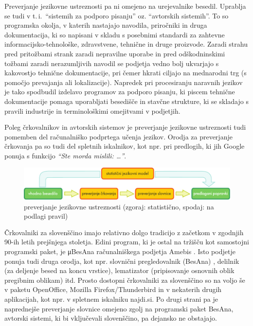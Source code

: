 \begin{multicols}{2}
Preverjanje jezikovne ustreznosti pa ni omejeno na urejevalnike besedil. Uprab\-lja se tudi v t.\,i.~“sistemih za podporo pisanju” oz. “avtorskih sistemih”. To so programska okolja, v katerih nastajajo navodila, priročniki in druga dokumentacija, ki so napisani v skladu s posebnimi standardi za zah\-tevne informacij\-sko-tehnološke, zdravstvene, tehnične in druge proizvode. Zaradi strahu pred pritožbami strank zaradi nepravilne uporabe in pred odškodninskimi tožbami zaradi nerazumljivih navodil se podjetja vedno bolj ukvarjajo s kakovostjo tehnične dokumentacije, pri čemer hkrati ciljajo na mednarodni trg (s pomočjo prevajanja ali lokalizacije). Napredek pri procesiranju naravnih jezikov je tako spodbudil izdelavo programov za podporo pisanju, ki piscem tehnične dokumentacije pomaga uporab\-ljati besedišče in stavčne strukture, ki se skladajo s pravili industrije in terminološkimi omejitvami v podjetjih.

Poleg črkovalnikov in avtorskih sistemov je preverjanje jezikovne ustreznosti tudi pomemben del računalniško podprtega učenja jezikov. Orodja za preverjanje črkovanja pa so tudi del spletnih iskalnikov, kot npr. pri predlogih, ki jih Google ponuja s funkcijo \textit{“Ste morda mislili: …”}.


\begin{figure}[htb]
  \center
  \includegraphics[width=\textwidth]{../_media/slovene/language_checking}
  \caption{preverjanje jezikovne ustreznosti (zgoraj: statistično, spodaj: na podlagi pravil)}
  \label{fig:langcheckingaarch_de}
\end{figure}

Črkovalniki za slovenščino imajo relativno dolgo tradicijo z začetkom v zgodnjih 90-ih letih prejšnjega stoletja. Edini program, ki je ostal na tržišču kot samostojni programski paket, je μBesAna računalniškega podjetja Amebis  \cite{Amb1}. Isto podjetje ponuja tudi druga orodja, kot npr. slovnični pregledovalnik (BesAna) \cite{Amb2}, delilnik (za deljenje besed na koncu vrstice), lematizator (pripisovanje osnovnih oblik pregibnim oblikam) itd.  Prosto dostopni črkovalniki za slovenščino so na voljo še v paketu OpenOffice, Mozilla Firefox/Thunderbird in v nekaterih drugih aplikacijah, kot npr. v spletnem iskalniku najdi.si.\- Po drugi strani pa je naprednejše preverjanje slovnice omejeno zgolj na programski paket BesAna, avtorski sistemi, ki bi vključevali slovenščino, pa dejansko ne obstajajo.


\end{multicols}
